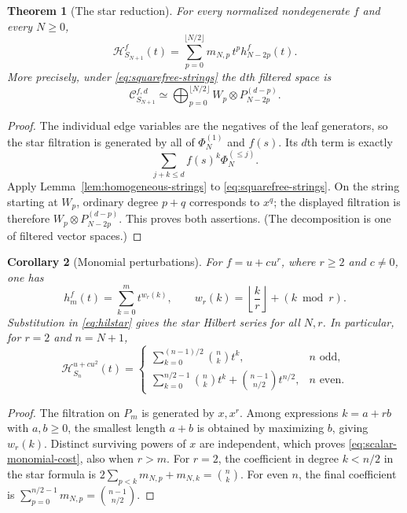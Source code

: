 \documentclass[reqno]{article}
\theoremstyle{plain} %
\newtheorem{theorem}{Theorem}[section]
\newtheorem{corollary}[theorem]{Corollary}
\theoremstyle{definition}
\theoremstyle{remark}
\newcommand {\CC}{\mathscr{C}}
\newcommand{\hs}{\mathscr{H}}
\numberwithin{equation}{section}
\begin{document}
\begin{theorem}[The star reduction]\label{thm:star-hilb}
For every normalized nondegenerate $f$ and every $N\ge0$,
\begin{equation}\label{eq:hilstar}
 \hs_{S_{N+1}}^f(t)
 =\sum_{p=0}^{\lfloor N/2\rfloor}m_{N,p}\,t^p h_{N-2p}^f(t).
\end{equation}
More precisely, under \eqref{eq:squarefree-strings} the $d$th filtered
space is
\begin{equation}\label{eq:star-filtered-strings}
 \CC_{S_{N+1}}^{f,d}
 \simeq\bigoplus_{p=0}^{\lfloor N/2\rfloor}
            W_p\otimes P_{N-2p}^{(d-p)}.
\end{equation}
\end{theorem}
\begin{proof}
The individual edge variables are the negatives of the leaf generators,
so the star filtration is generated by all of $\Phi_N^{(1)}$ and $f(s)$.
Its $d$th term is exactly
\[
 \sum_{j+k\le d}f(s)^k\Phi_N^{(\le j)}.
\]
Apply Lemma~\ref{lem:homogeneous-strings} to
\eqref{eq:squarefree-strings}. On the string starting at $W_p$,
ordinary degree $p+q$ corresponds to $x^q$; the displayed filtration
is therefore $W_p\otimes P_{N-2p}^{(d-p)}$.
This proves both assertions. (The decomposition is one of filtered
vector spaces.)
\end{proof}

\begin{corollary}[Monomial perturbations]\label{cor:star-monomial}
For $f=u+cu^r$, where $r\ge2$ and $c\ne0$, one has
\begin{equation}\label{eq:scalar-monomial-cost}
 h_m^f(t)=\sum_{k=0}^m t^{w_r(k)},\qquad
 w_r(k)=\left\lfloor\frac kr\right\rfloor+(k\bmod r).
\end{equation}
Substitution in \eqref{eq:hilstar} gives the star Hilbert series for
all $N,r$. In particular, for $r=2$ and $n=N+1$,
\begin{equation}\label{eq:star-quadratic-binomial}
 \hs_{S_n}^{u+cu^2}(t)=
 \begin{cases}
 \displaystyle\sum_{k=0}^{(n-1)/2}\binom nk t^k,&n\text{ odd},\\[2mm]
 \displaystyle\sum_{k=0}^{n/2-1}\binom nk t^k+
       \binom{n-1}{n/2}t^{n/2},&n\text{ even}.
 \end{cases}
\end{equation}
\end{corollary}
\begin{proof}
The filtration on $P_m$ is generated by $x,x^r$. Among expressions
$k=a+rb$ with $a,b\ge0$, the smallest length $a+b$ is obtained by
maximizing $b$, giving $w_r(k)$. Distinct surviving powers of $x$ are
independent, which proves \eqref{eq:scalar-monomial-cost}, also when
$r>m$. For $r=2$, the coefficient in degree $k<n/2$ in the star formula
is $2\sum_{p<k}m_{N,p}+m_{N,k}=\binom nk$.
For even $n$, the final coefficient is
$\sum_{p=0}^{n/2-1}m_{N,p}=\binom{n-1}{n/2}$.
\end{proof}
\end{document}
